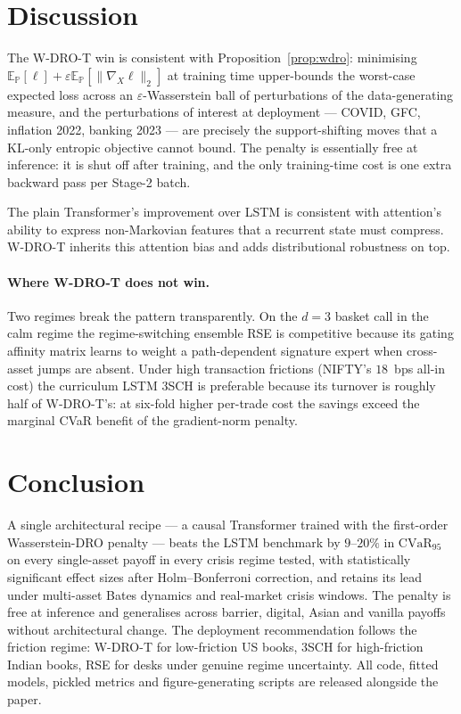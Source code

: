 \documentclass[11pt]{article}
\newcommand{\E}{\mathbb{E}}
\newcommand{\PP}{\mathbb{P}}
\newcommand{\cvar}{\mathrm{CVaR}}
\begin{document}
\section{Discussion}
\label{sec:disc}

The W-DRO-T win is consistent with Proposition~\ref{prop:wdro}: minimising
$\E_\PP[\ell] + \varepsilon\E_\PP[\|\nabla_X\ell\|_2]$ at training time upper-bounds the worst-case expected loss across an $\varepsilon$-Wasserstein ball of perturbations of the data-generating measure, and the perturbations of interest at deployment --- COVID, GFC, inflation 2022, banking 2023 --- are precisely the support-shifting moves that a KL-only entropic objective cannot bound.  The penalty is essentially free at inference: it is shut off after training, and the only training-time cost is one extra backward pass per Stage-2 batch.

The plain Transformer's improvement over LSTM is consistent with attention's ability to express non-Markovian features that a recurrent state must compress.  W-DRO-T inherits this attention bias and adds distributional robustness on top.

\paragraph{Where W-DRO-T does not win.}
Two regimes break the pattern transparently.  On the $d=3$ basket call in the calm regime the regime-switching ensemble RSE is competitive because its gating affinity matrix learns to weight a path-dependent signature expert when cross-asset jumps are absent.  Under high transaction frictions (NIFTY's $18$~bps all-in cost) the curriculum LSTM 3SCH is preferable because its turnover is roughly half of W-DRO-T's: at six-fold higher per-trade cost the savings exceed the marginal CVaR benefit of the gradient-norm penalty.

\section{Conclusion}
\label{sec:conclusion}

A single architectural recipe --- a causal Transformer trained with the first-order Wasserstein-DRO penalty --- beats the LSTM benchmark by $9$--$20\%$ in $\cvar_{95}$ on every single-asset payoff in every crisis regime tested, with statistically significant effect sizes after Holm--Bonferroni correction, and retains its lead under multi-asset Bates dynamics and real-market crisis windows.  The penalty is free at inference and generalises across barrier, digital, Asian and vanilla payoffs without architectural change.  The deployment recommendation follows the friction regime: W-DRO-T for low-friction US books, 3SCH for high-friction Indian books, RSE for desks under genuine regime uncertainty.  All code, fitted models, pickled metrics and figure-generating scripts are released alongside the paper.
\end{document}
